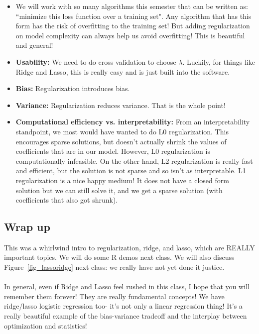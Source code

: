 \begin{itemize}
\item We will work with so many algorithms this semester that can be written as: ``minimize this loss function over a training set". Any algorithm that has this form has the risk of overfitting to the training set! But adding regularization on model complexity can always help us avoid overfitting! This is beautiful and general!
\item \textbf{Usability:} We need to do cross validation to choose $\lambda$. Luckily, for things like Ridge and Lasso, this is really easy and is just built into the software. 
\item \textbf{Bias:} Regularization introduces bias.
\item \textbf{Variance: } Regularization reduces variance. That is the whole point!
\item \textbf{Computational efficiency vs. interpretability: } From an interpretability standpoint, we most would have wanted to do L0 regularization. This encourages sparse solutions, but doesn't actually shrink the values of coefficients that are in our model. However, L0 regularization is computationally infeasible. On the other hand, L2 regularization is really fast and efficient, but the solution is not sparse and so isn't as interpretable. L1 regularization is a nice happy medium! It does not have a closed form solution but we can still solve it, and we get a sparse solution (with coefficients that also got shrunk). 
\end{itemize}


\subsection{Wrap up}

This was a whirlwind intro to regularization, ridge, and lasso, which are REALLY important topics. We will do some R demos next class. We will also discuss Figure~\ref{fig_lassoridge} next class: we really have not yet done it justice.\\
\\
In general, even if Ridge and Lasso feel rushed in this class, I hope that you will remember them forever! They are really fundamental concepts! We have ridge/lasso logistic regression too- it's not only a linear regression thing! It's a really beautiful example of the bias-variance tradeoff and the interplay between optimization and statistics!
